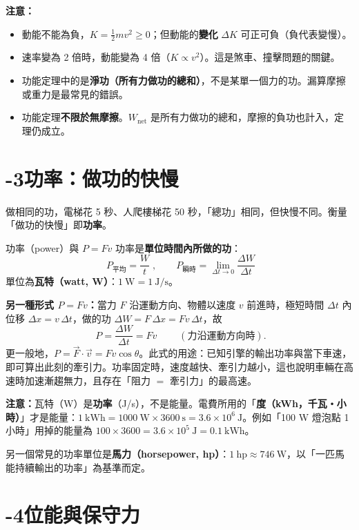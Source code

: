 \documentclass[11pt]{article}
\begin{document}
\textbf{注意：}
\begin{itemize}\setlength{\itemsep}{1pt}
\item 動能不能為負，$K=\tfrac12mv^2\ge0$；但動能的\textbf{變化} $\Delta K$ 可正可負（負代表變慢）。
\item 速率變為 2 倍時，動能變為 4 倍（$K\propto v^2$）。這是煞車、撞擊問題的關鍵。
\item 功能定理中的是\textbf{淨功（所有力做功的總和）}，不是某單一個力的功。漏算摩擦或重力是最常見的錯誤。
\item 功能定理\textbf{不限於無摩擦}。$W_{\text{net}}$ 是所有力做功的總和，摩擦的負功也計入，定理仍成立。
\end{itemize}

\section*{-3\quad 功率：做功的快慢}

做相同的功，電梯花 5 秒、人爬樓梯花 50 秒，「總功」相同，但快慢不同。衡量「做功的快慢」即\textbf{功率}。

\begin{補充框}{功率（power）與 $P=Fv$}
功率是\textbf{單位時間內所做的功}：
$$\boxed{\;P_{\text{平均}}=\frac{W}{t}\;},\qquad P_{\text{瞬時}}=\lim_{\Delta t\to0}\frac{\Delta W}{\Delta t}$$
單位為\textbf{瓦特（watt, W）}：$1\ \text{W}=1\ \text{J/s}$。

\textbf{另一種形式 $P=Fv$：}當力 $F$ 沿運動方向、物體以速度 $v$ 前進時，極短時間 $\Delta t$ 內位移 $\Delta x=v\,\Delta t$，做的功 $\Delta W=F\,\Delta x=Fv\,\Delta t$，故
$$\boxed{\;P=\frac{\Delta W}{\Delta t}=Fv\;}\qquad(\text{力沿運動方向時}).$$
更一般地，$P=\vec F\cdot\vec v=Fv\cos\theta$。此式的用途：已知引擎的輸出功率與當下車速，即可算出此刻的牽引力。功率固定時，速度越快、牽引力越小，這也說明車輛在高速時加速漸趨無力，且存在「阻力 $=$ 牽引力」的最高速。
\end{補充框}

\textbf{注意：}瓦特（W）是\textbf{功率}（J/s），不是能量。電費所用的「\textbf{度（kWh，千瓦・小時）}」才是能量：$1\ \text{kWh}=1000\ \text{W}\times3600\ \text{s}=3.6\times10^6\ \text{J}$。例如「100 W 燈泡點 1 小時」用掉的能量為 $100\times3600=3.6\times10^5\ \text{J}=0.1\ \text{kWh}$。

另一個常見的功率單位是\textbf{馬力（horsepower, hp）}：$1\ \text{hp}\approx746\ \text{W}$，以「一匹馬能持續輸出的功率」為基準而定。

\section*{-4\quad 位能與保守力}
\end{document}
